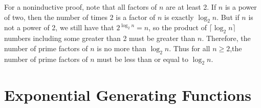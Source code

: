 \documentclass[10pt,]{book}
\theoremstyle{plain}
\theoremstyle{definition}
\numberwithin{equation}{chapter}
\begin{document}
\begin{enumerate}
\par
For a noninductive proof, note that all factors of \(n\) are at least 2. If \(n\) is a power of two, then the number of times \(2\) is a factor of \(n\) is exactly \(\log_2 n\). But if \(n\) is not a power of 2, we still have that \(2^{\log_2 n}=n\), so the product of \(\lceil\log_2 n\rceil\) numbers including some greater than 2 must be greater than \(n\). Therefore, the number of prime factors of \(n\) is no more than \(\log_2 n\). Thus for all \(n\ge2\),the number of prime factors of \(n\) must be less than or equal to \(\log_2 n\).%
 \setcounter{problemnumber}{\value{enumi}}%
\end{enumerate}
%
%
\backmatter
%
\typeout{************************************************}
\typeout{************************************************}
\chapter[{Exponential Generating Functions}]{Exponential Generating Functions}\label{expogenfun}
\typeout{************************************************}
\typeout{************************************************}
\end{document}
